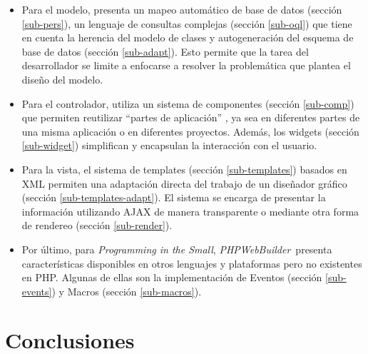 \documentclass[a4paper,10pt]{article}
\newcommand{\PITS}{\emph{Programming in the Small}} %
\newcommand{\PWB}{\emph{PHPWebBuilder}}
\begin{document}
\begin{itemize}
\item Para el modelo, presenta un mapeo automático de base de datos (sección \ref{sub-pers}), un lenguaje de consultas complejas (sección \ref{sub-oql}) que tiene en cuenta la herencia del modelo de clases y autogeneración del esquema de base de datos (sección \ref{sub-adapt}). Esto permite que la tarea del desarrollador se limite a enfocarse a resolver la problemática que plantea el diseño del modelo.

\item Para el controlador, utiliza un sistema de componentes (sección \ref{sub-comp}) que permiten reutilizar ``partes de aplicación'' , ya sea en diferentes partes de una misma aplicación o en diferentes proyectos. Además, los widgets (sección \ref{sub-widget}) simplifican y encapsulan la interacción con el usuario.

\item Para la vista, el sistema de templates (sección \ref{sub-templates}) basados en XML permiten una adaptación directa del trabajo de un diseñador gráfico (sección \ref{sub-templates-adapt}). El sistema se encarga de presentar la información utilizando AJAX de manera transparente o mediante otra forma de rendereo (sección \ref{sub-render}).

\item Por último, para \PITS, \PWB \ presenta características disponibles en otros lenguajes y plataformas pero no existentes en PHP. Algunas de ellas son la implementación de Eventos (sección \ref{sub-events}) 
y Macros (sección \ref{sub-macros}).

\end{itemize}


%




\section{Conclusiones}
\end{document}
